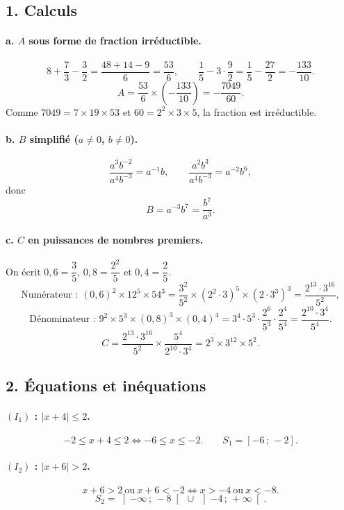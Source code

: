 \documentclass[11pt,a4paper]{article}
\begin{document}
\subsection*{1. Calculs}

\paragraph{a. $A$ sous forme de fraction irr\'eductible.}
\[
8+\frac73-\frac32=\frac{48+14-9}{6}=\frac{53}{6},\qquad
\frac15-3\cdot\frac92=\frac15-\frac{27}{2}=-\frac{133}{10}.
\]
\[
A=\frac{53}{6}\times\left(-\frac{133}{10}\right)=-\frac{7049}{60}.
\]
Comme $7049=7\times19\times53$ et $60=2^2\times3\times5$, la fraction est irr\'eductible.

\paragraph{b. $B$ simplifi\'e ($a\neq0$, $b\neq0$).}
\[
\frac{a^3b^{-2}}{a^4b^{-3}}=a^{-1}b,\qquad \frac{a^2b^3}{a^4b^{-3}}=a^{-2}b^6,
\]
donc
\[
B=a^{-3}b^{7}=\frac{b^7}{a^3}.
\]

\paragraph{c. $C$ en puissances de nombres premiers.}
On \'ecrit $0{,}6=\dfrac35$, $0{,}8=\dfrac{2^2}{5}$ et $0{,}4=\dfrac25$.
\[
\text{Num\'erateur : }(0{,}6)^2\times12^5\times54^3=\frac{3^2}{5^2}\times(2^2\cdot3)^5\times(2\cdot3^3)^3=\frac{2^{13}\cdot3^{16}}{5^2},
\]
\[
\text{D\'enominateur : }9^2\times5^3\times(0{,}8)^3\times(0{,}4)^4=3^4\cdot5^3\cdot\frac{2^6}{5^3}\cdot\frac{2^4}{5^4}=\frac{2^{10}\cdot3^4}{5^4}.
\]
\[
C=\frac{2^{13}\cdot3^{16}}{5^2}\times\frac{5^4}{2^{10}\cdot3^4}=2^3\times3^{12}\times5^2.
\]

\subsection*{2. \'Equations et in\'equations}

\paragraph{$(I_1)$ : $\lvert x+4\rvert\le2$.}
\[
-2\le x+4\le2\iff-6\le x\le-2.\qquad S_1=[-6\,;\,-2].
\]

\paragraph{$(I_2)$ : $\lvert x+6\rvert>2$.}
\[
x+6>2\ \text{ou}\ x+6<-2\iff x>-4\ \text{ou}\ x<-8.
\]
\[
S_2=\left]-\infty\,;\,-8\right[\ \cup\ \left]-4\,;\,+\infty\right[.
\]
\end{document}
